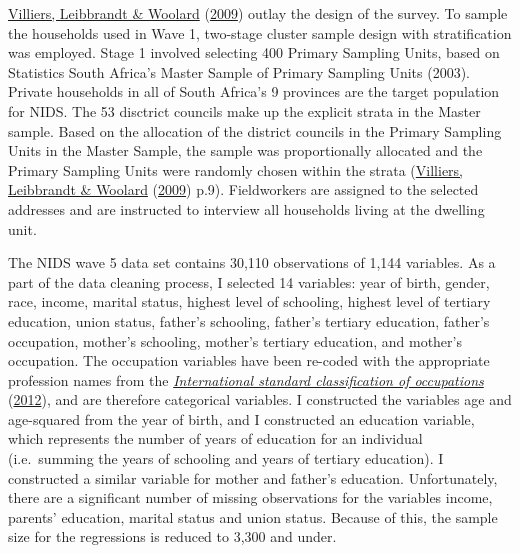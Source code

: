 \documentclass[11pt,preprint, authoryear]{elsarticle}
\numberwithin{equation}{section}
\numberwithin{figure}{section}
\numberwithin{table}{section}
\begin{document}
\protect\hyperlink{ref-nids1}{Villiers, Leibbrandt \& Woolard}
(\protect\hyperlink{ref-nids1}{2009}) outlay the design of the survey.
To sample the households used in Wave 1, two-stage cluster sample design
with stratification was employed. Stage 1 involved selecting 400 Primary
Sampling Units, based on Statistics South Africa's Master Sample of
Primary Sampling Units (2003). Private households in all of South
Africa's 9 provinces are the target population for NIDS. The 53
disctrict councils make up the explicit strata in the Master sample.
Based on the allocation of the district councils in the Primary Sampling
Units in the Master Sample, the sample was proportionally allocated and
the Primary Sampling Units were randomly chosen within the strata
(\protect\hyperlink{ref-nids1}{Villiers, Leibbrandt \& Woolard}
(\protect\hyperlink{ref-nids1}{2009}) p.9). Fieldworkers are assigned to
the selected addresses and are instructed to interview all households
living at the dwelling unit.

The NIDS wave 5 data set contains 30,110 observations of 1,144
variables. As a part of the data cleaning process, I selected 14
variables: year of birth, gender, race, income, marital status, highest
level of schooling, highest level of tertiary education, union status,
father's schooling, father's tertiary education, father's occupation,
mother's schooling, mother's tertiary education, and mother's
occupation. The occupation variables have been re-coded with the
appropriate profession names from the
\protect\hyperlink{ref-isco}{\emph{International standard classification
of occupations}} (\protect\hyperlink{ref-isco}{2012}), and are therefore
categorical variables. I constructed the variables age and age-squared
from the year of birth, and I constructed an education variable, which
represents the number of years of education for an individual
(i.e.~summing the years of schooling and years of tertiary education). I
constructed a similar variable for mother and father's education.
Unfortunately, there are a significant number of missing observations
for the variables income, parents' education, marital status and union
status. Because of this, the sample size for the regressions is reduced
to 3,300 and under.
\end{document}
